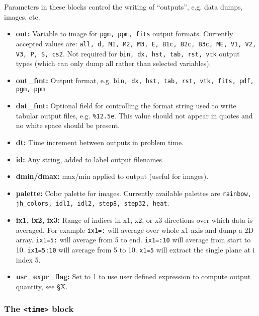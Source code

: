Parameters in these blocks control the writing of ``outputs'',
e.g. data dumps, images, etc.
\begin{itemize}

\item {\bf out:} Variable to image for {\tt pgm, ppm, fits} output formats.
Currently accepted values are:
{\tt all, d, M1, M2, M3, E, B1c, B2c, B3c, ME, V1, V2, V3, P, S, cs2}.
Not required for {\tt bin, dx, hst, tab, rst, vtk} output types 
(which can only dump all rather than selected variables).

\item {\bf out\_fmt:} Output format, e.g.  
{\tt bin, dx, hst, tab, rst, vtk, fits, pdf, pgm, ppm}

\item {\bf dat\_fmt:} Optional field for controlling the format string used 
to write tabular output files, e.g. {\tt \%12.5e}.  This value should
not appear in quotes and no white space should be present.

\item {\bf dt:} Time increment between outputs in problem time.

\item {\bf id:} Any string, added to label output filenames.

\item {\bf dmin/dmax:} max/min applied to output (useful for images).

\item {\bf palette:} Color palette for images.  Currently available palettes
are {\tt rainbow, jh\_colors, idl1, idl2, step8, step32, heat}.

\item {\bf ix1, ix2, ix3:} Range of indices in x1, x2, or x3 directions over
which data is averaged.  For example {\tt ix1=:} will average over whole x1 axis
and dump a 2D array.  {\tt ix1=5:} will average from 5 to end. {\tt ix1=:10}
will average from start to 10. {\tt ix1=5:10} will average from 5 to 10.
{\tt x1=5} will extract the single plane at i index 5.

\item {\bf usr\_expr\_flag:} Set to 1 to use user defined expression to compute
output quantity, see \S X.

\end{itemize}

\subsubsection{The {\tt <time>} block}

